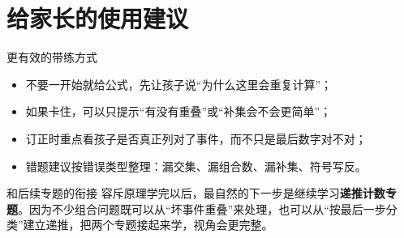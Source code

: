 \documentclass[11pt,a4paper,fontset=fandol]{ctexart}
\begin{document}
\section{给家长的使用建议}

\begin{warnbox}{更有效的带练方式}
\begin{itemize}
  \item 不要一开始就给公式，先让孩子说“为什么这里会重复计算”；
  \item 如果卡住，可以只提示“有没有重叠”或“补集会不会更简单”；
  \item 订正时重点看孩子是否真正列对了事件，而不只是最后数字对不对；
  \item 错题建议按错误类型整理：漏交集、漏组合数、漏补集、符号写反。
\end{itemize}
\end{warnbox}

\begin{infobox}{和后续专题的衔接}
容斥原理学完以后，最自然的下一步是继续学习\textbf{递推计数专题}。因为不少组合问题既可以从“坏事件重叠”来处理，也可以从“按最后一步分类”建立递推，把两个专题接起来学，视角会更完整。
\end{infobox}
\end{document}
